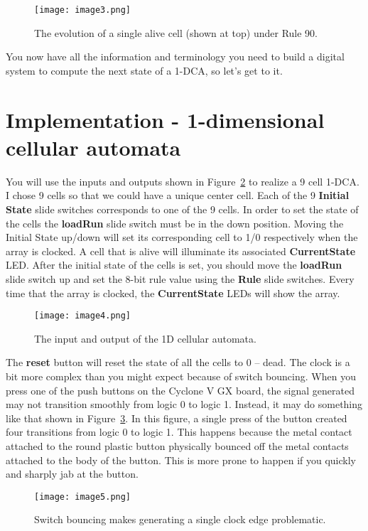 \begin{figure}
\texttt{[image: image3.png]}
\caption{The evolution of a single alive cell (shown at top) under Rule 90.}
\label{fig:caEvolution}
\end{figure}

You now have all the information and terminology you need to build a
digital system to compute the next state of a 1-DCA, so let's get to it.

\section{Implementation - 1-dimensional cellular automata}

You will use the inputs and outputs shown in Figure~\ref{fig:caDevBoard} to realize a
9 cell 1-DCA. I chose 9 cells so that we could have a unique center
cell. Each of the 9 \textbf{Initial State} slide switches corresponds to
one of the 9 cells. In order to set the state of the cells the
\textbf{loadRun} slide switch must be in the down position. Moving the
Initial State up/down will set its corresponding cell to 1/0
respectively when the array is clocked. A cell that is alive will
illuminate its associated \textbf{CurrentState} LED. After the initial
state of the cells is set, you should move the \textbf{loadRun} slide
switch up and set the 8-bit rule value using the \textbf{Rule} slide
switches. Every time that the array is clocked, the
\textbf{CurrentState} LEDs will show the array.

\begin{figure}
\texttt{[image: image4.png]}
\caption{The input and output of the 1D cellular automata.}
\label{fig:caDevBoard}
\end{figure}

The \textbf{reset} button will reset the state of all the cells to 0 --
dead. The clock is a bit more complex than you might expect because of
switch bouncing. When you press one of the push buttons on the Cyclone V
GX board, the signal generated may not transition smoothly from logic 0
to logic 1. Instead, it may do something like that shown in Figure~\ref{fig:caSwitchBounce}. In
this figure, a single press of the button created four transitions from
logic 0 to logic 1. This happens because the metal contact attached to
the round plastic button physically bounced off the metal contacts
attached to the body of the button. This is more prone to happen if you
quickly and sharply jab at the button.

\begin{figure}
\texttt{[image: image5.png]}
\caption{Switch bouncing makes generating a single clock edge problematic.}
\label{fig:caSwitchBounce}
\end{figure}

